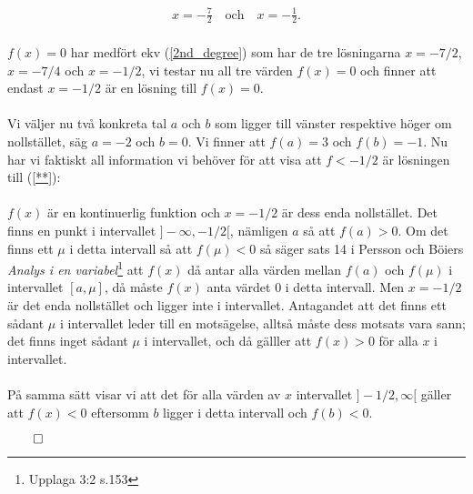 \documentclass{article}
\begin{document}
\begin{gather*}
  x = -\frac{7}{2} \quad \text{och} \quad x = - \frac{1}{2}\text{.}
\end{gather*}
\\
$f(x) = 0$ har medfört ekv (\ref{2nd_degree}) som har de tre lösningarna $x = -7/2$, $x = -7/4$ och $x = -1/2$, vi testar nu all tre värden $f(x) = 0$ och finner att endast $x = -1/2$ är en lösning till $f(x) = 0$.
\\
\\
Vi väljer nu två konkreta tal $a$ och $b$ som ligger till vänster respektive höger om nollstället, säg $a = -2$ och $b = 0$. Vi finner att $f(a) = 3$ och $f(b) = -1$. Nu har vi faktiskt all information vi behöver för att visa att $f < -1/2$ är lösningen till (\ref{**}):
\\
\\
$f(x)$ är en kontinuerlig funktion och $x = -1/2$ är dess enda nollstället. Det finns en punkt i intervallet $]-\infty, -1/2[$, nämligen $a$ så att $f(a) > 0$. Om det finns ett $\mu$ i detta intervall så att $f(\mu) < 0$ så säger sats 14 i Persson och Böiers \emph{Analys i en variabel}\footnote{Upplaga 3:2 s.153} att $f(x)$ då antar alla värden mellan $f(a)$ och $f(\mu)$ i intervallet $[a, \mu]$, då måste $f(x)$ anta värdet $0$ i detta intervall. Men $x = -1/2$ är det enda nollstället och ligger inte i intervallet. Antagandet att det finns ett sådant $\mu$ i intervallet leder till en motsägelse, alltså måste dess motsats vara sann; det finns inget sådant $\mu$ i intervallet, och då gälller att $f(x) > 0$ för alla $x$ i intervallet.
\\
\\På samma sätt visar vi att det för alla värden av $x$ intervallet $ ]-1/2, \infty[$ gäller att $f(x) < 0$ eftersomm $b$ ligger i detta intervall och $f(b) < 0$.

\centerline{$\qed$}
\end{document}
